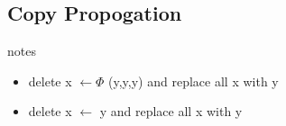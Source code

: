 



\subsection{Copy Propogation}

\begin{note}{notes}
\begin{itemize}
    \item  delete x $\gets \Phi$ (y,y,y) and replace all x with y
    \item delete x $\gets$ y and replace all x with y
\end{itemize}
\end{note}







